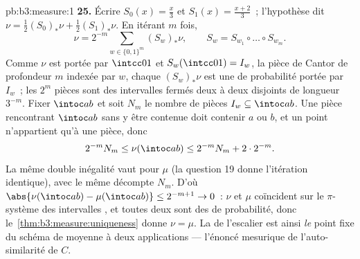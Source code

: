\begin{solution}{pb:b3:measure:1}
\textbf{25.} Écrire $S_0(x) = \frac x3$ et $S_1(x) =
\frac{x+2}3$~; l'hypothèse dit $\nu = \frac12(S_0)_*\nu +
\frac12(S_1)_*\nu$. En itérant $m$ fois,
\[
\nu = 2^{-m}\sum_{w \in \{0,1\}^m}(S_w)_*\nu,
\qquad S_w = S_{w_1}\circ\dots\circ S_{w_m}.
\]
Comme $\nu$ est portée par $\intcc01$ et $S_w(\intcc01) =
I_w$, la pièce de Cantor de profondeur $m$ indexée par $w$,
chaque $(S_w)_*\nu$ est une  de probabilité portée par
$I_w$~; les $2^m$ pièces sont des intervalles fermés deux à
deux disjoints de longueur $3^{-m}$. Fixer $\intoc ab$ et
soit $N_m$ le nombre de pièces $I_w \subseteq \intoc ab$.
Une pièce rencontrant $\intoc ab$ sans y être contenue doit
contenir $a$ ou $b$, et un point n'appartient qu'à une
pièce, donc
\[
2^{-m}N_m \leq \nu(\intoc ab) \leq 2^{-m}N_m + 2\cdot2^{-m}.
\]
La même double inégalité vaut pour $\mu$ (la question 19
donne l'itération identique), avec le même décompte $N_m$.
D'où $\abs{\nu(\intoc ab) - \mu(\intoc ab)} \leq 2^{-m+1}
\to 0$~: $\nu$ et $\mu$ coïncident sur le $\pi$-système des
intervalles , et toutes deux sont des  de
probabilité, donc le~\cref{thm:b3:measure:uniqueness} donne
$\nu = \mu$. La  de l'escalier est ainsi \emph{le}
point fixe du schéma de moyenne à deux applications ---
l'énoncé mesurique de l'auto-similarité de $C$.
\end{solution}

